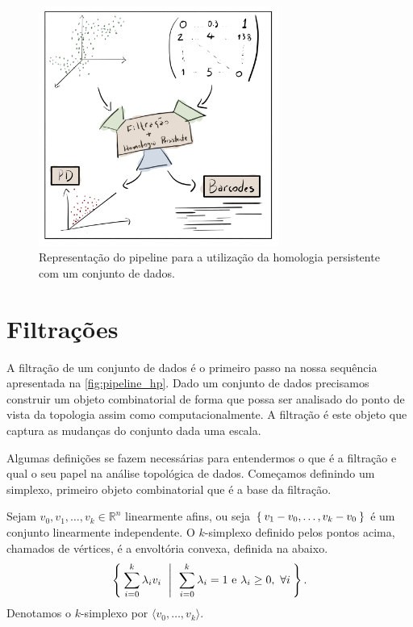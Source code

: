 \begin{figure}[!htpb]
  \centering
  \includegraphics[width=0.7\textwidth]{images/pipeline_hp.png}
  \caption{Representação do pipeline para a utilização da homologia persistente
          com um conjunto de dados.}
  \label{fig:pipeline_hp}
  \fautor
\end{figure}


\section{Filtrações}
A filtração de um conjunto de dados é o primeiro passo na nossa sequência apresentada
na \autoref{fig:pipeline_hp}.
Dado um conjunto de dados precisamos construir um objeto combinatorial de forma
que possa ser analisado do ponto de vista da topologia assim como computacionalmente.
A filtração é este objeto que captura as mudanças do conjunto dada uma escala.

Algumas definições se fazem necessárias para entendermos o que é a filtração
e qual o seu papel na análise topológica de dados. Começamos definindo um simplexo,
primeiro objeto combinatorial que é a base da filtração.

\begin{defi}
  Sejam $v_0, v_1, \dots, v_k \in \mathbb{R}^n$ linearmente afins, ou seja $\Set{v_1 - v_0, \dots, v_k - v_0}$
  é um conjunto linearmente independente. O $k$-simplexo definido pelos pontos acima,
  chamados de vértices, é a envoltória convexa, definida na abaixo.
  \begin{equation}
    \label{eq:envconv}
    \Set{\sum_{i=0}^k \lambda_i v_i \ | \ \sum_{i=0}^k \lambda_i = 1 \text{ e }
          \lambda_i \ge 0, \ \forall i}.
  \end{equation}
  Denotamos o $k$-simplexo por $\langle v_0, \dots, v_k \rangle$.
\end{defi}

